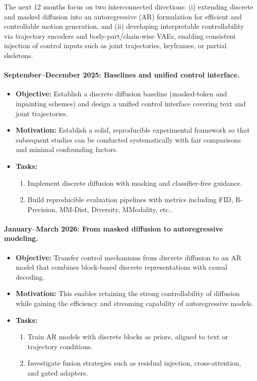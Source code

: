\documentclass[a4paper,12pt]{article}
\begin{document}
The next 12 months focus on two interconnected directions:  
(i) extending discrete and masked diffusion into an autoregressive (AR) formulation for efficient and controllable motion generation, and  
(ii) developing interpretable controllability via trajectory encoders and body-part/chain-wise VAEs, enabling consistent injection of control inputs such as joint trajectories, keyframes, or partial skeletons.  

\paragraph{September--December 2025: Baselines and unified control interface.}  
\begin{itemize}
    \item \textbf{Objective:} Establish a discrete diffusion baseline (masked-token and inpainting schemes) and design a unified control interface covering text and joint trajectories.  
    \item \textbf{Motivation:} Establish a solid, reproducible experimental framework so that subsequent studies can be conducted systematically with fair comparisons and minimal confounding factors. 
    \item \textbf{Tasks:}
    \begin{enumerate}
        \item Implement discrete diffusion with masking and classifier-free guidance.  
        \item Build reproducible evaluation pipelines with metrics including FID, R-Precision, MM-Dist, Diversity, MModality, etc..  
    \end{enumerate}
\end{itemize}

\paragraph{January--March 2026: From masked diffusion to autoregressive modeling.}  
\begin{itemize}
    \item \textbf{Objective:} Transfer control mechanisms from discrete diffusion to an AR model that combines block-based discrete representations with causal decoding.  
    \item \textbf{Motivation:} This enables retaining the strong controllability of diffusion while gaining the efficiency and streaming capability of autoregressive models.  
    \item \textbf{Tasks:}
    \begin{enumerate}
        \item Train AR models with discrete blocks as priors, aligned to text or trajectory conditions.  
        \item Investigate fusion strategies such as residual injection, cross-attention, and gated adapters.  
    \end{enumerate}
\end{itemize}
\end{document}
